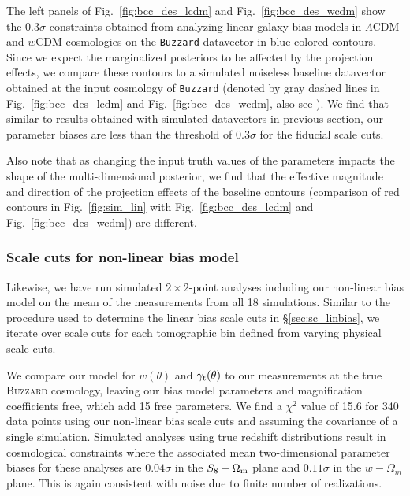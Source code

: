 \documentclass[aps, prd,twocolumn,superscriptaddress,nofootinbib,preprintnumbers]{revtex4-1}
\newcommand{\gammat}{\ensuremath{\gamma_{\rm t}(\theta)}}
\newcommand{\wtheta}{\ensuremath{w(\theta)}}
\newcommand{\buzzard}{\texttt{Buzzard} }
\newcommand{\blue}[1]{\textcolor{blue}{#1}}
\begin{document}
The left panels of Fig.~\ref{fig:bcc_des_lcdm} and Fig.~\ref{fig:bcc_des_wcdm} show the 0.3$\sigma$ constraints obtained from analyzing linear galaxy bias models in $\Lambda$CDM and $w$CDM cosmologies on the \buzzard datavector in blue colored contours. Since we expect the marginalized posteriors to be affected by the projection effects, we compare these contours to a simulated noiseless baseline datavector obtained at the input cosmology of \buzzard (denoted by gray dashed lines in Fig.~\ref{fig:bcc_des_lcdm} and Fig.~\ref{fig:bcc_des_wcdm}, also see \citet*{DeRose2019}). We find that similar to results obtained with simulated datavectors in previous section, our parameter biases are less than the threshold of 0.3$\sigma$ for the fiducial scale cuts. 

Also note that as changing the input truth values of the parameters impacts the shape of the multi-dimensional posterior, we find that the effective magnitude and direction of the projection effects of the baseline contours (comparison of red contours in  Fig.~\ref{fig:sim_lin} with Fig.~\ref{fig:bcc_des_lcdm} and Fig.~\ref{fig:bcc_des_wcdm}) are different. 

\subsubsection{Scale cuts for non-linear bias model}
Likewise, we have run simulated $2\times 2$-point analyses including our non-linear bias model on the mean of the measurements from all 18 simulations. Similar to the procedure used to determine the linear bias scale cuts in \S\ref{sec:sc_linbias}, we iterate over scale cuts for each tomographic bin defined from varying physical scale cuts. 

We compare our model for $w(\theta)$ and $\gamma_{\rm t}(\theta)$ to our measurements at the true \textsc{Buzzard} cosmology, leaving our bias model parameters and magnification coefficients free, which add 15 free parameters. We find a $\chi^2$ value of 15.6 for 340 data points using our non-linear bias scale cuts and assuming the covariance of a single simulation. Simulated analyses using true redshift distributions result in cosmological constraints where the associated mean two-dimensional parameter biases for these analyses are $0.04\sigma$ in the $S_8-\Omega_{\rm m}$ plane and $0.11\sigma$ in the $w-\Omega_{m}$ plane. This is again consistent with noise due to finite number of realizations.
\end{document}
